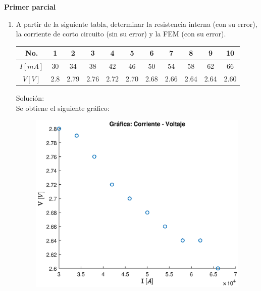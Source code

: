 \documentclass[letter,11pt]{article}
\begin{document}
\begin{center}
    {\Large \bf{Primer parcial}}
\end{center}

\noindent{}

\vspace{1.0cm}

\begin{enumerate}
\item A partir de la siguiente tabla, determinar la resistencia interna (con su
    error), la corriente de corto circuito (sin su error) y la FEM (con su
    error).

    \begin{center}
    \begin{tabular}{|c|c|c|c|c|c|c|c|c|c|c|}
    \hline
    No. & 1 & 2 & 3 & 4 & 5 & 6 & 7 & 8 & 9 & 10 \tabularnewline \hline
    $I[mA]$ & 30 & 34 & 38 & 42 & 46 & 50 & 54 & 58 & 62 & 66 \tabularnewline \hline
    $V[V]$  & 2.8 & 2.79 & 2.76 & 2.72 & 2.70 & 2.68 & 2.66 & 2.64 & 2.64 & 2.60 \tabularnewline \hline
    \end{tabular}
    \end{center}

    Solución: \\
    Se obtiene el siguiente gráfico:

    \begin{figure}[!h]
    \centering
    \includegraphics[scale=0.75]{resources/m1.eps}
    \end{figure}


\end{enumerate}
\end{document}
